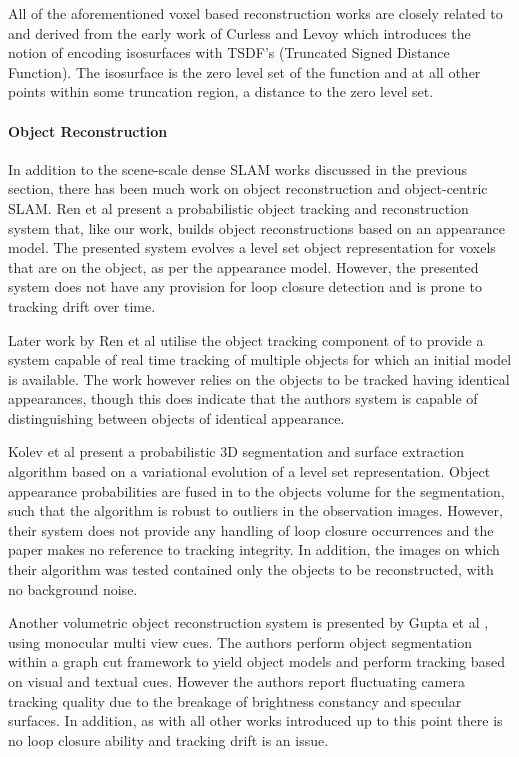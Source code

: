 All of the aforementioned voxel based reconstruction works are closely related to and derived from the early work of Curless and Levoy \cite{Curless1996} 
which introduces the notion of encoding isosurfaces with TSDF's (Truncated Signed Distance Function). The isosurface is the zero level set of the function 
and at all other points within some truncation region, a distance to the zero level set.

\paragraph{Object Reconstruction}
In addition to the scene-scale dense SLAM works discussed in the previous section, there has been much work on object reconstruction and 
object-centric SLAM. Ren et al \cite{Ren2013} present a probabilistic object tracking and reconstruction system that, like our work, builds 
object reconstructions based on an appearance model. The presented system evolves a level set object representation for voxels that 
are on the object, as per the appearance model. However, the presented system does not have any provision for loop closure detection and 
is prone to tracking drift over time.

Later work by Ren et al \cite{Ren2014} utilise the object tracking component of \cite{Ren2013} to provide a system capable of real time tracking 
of multiple objects for which an initial model is available. The work however relies on the objects to be tracked having identical appearances, 
though this does indicate that the authors system is capable of distinguishing between objects of identical appearance.

Kolev et al present a probabilistic 3D segmentation and surface extraction algorithm \cite{Kolev2006} based on a variational evolution of a level 
set representation. Object appearance probabilities are fused in to the objects volume for the segmentation, such that the algorithm is robust to 
outliers in the observation images. However, their system does not provide any handling of 
loop closure occurrences and the paper makes no reference to tracking integrity. In addition, the images on which their algorithm was tested 
contained only the objects to be reconstructed, with no background noise.

Another volumetric object reconstruction system is presented by Gupta et al \cite{Gupta2016}, using monocular multi view cues. The authors 
perform object segmentation within a graph cut framework to yield object models and perform tracking based on visual and textual cues. 
However the authors report fluctuating camera tracking quality due to the breakage of brightness constancy and specular surfaces. In addition, 
as with all other works introduced up to this point there is no loop closure ability and tracking drift is an issue.


